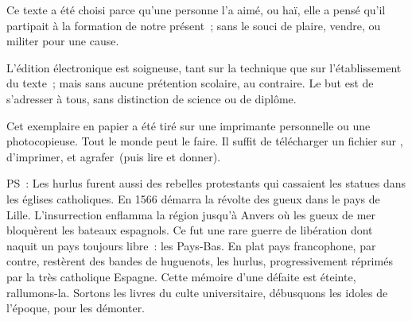 \documentclass[twoside]{book} %
\begin{document}
  Ce texte a été choisi parce qu’une personne l’a aimé,
  ou haï, elle a pensé qu’il partipait à la formation de notre présent ;
  sans le souci de plaire, vendre, ou militer pour une cause.
  \par

  L’édition électronique est soigneuse, tant sur la technique
  que sur l’établissement du texte ; mais sans aucune prétention scolaire, au contraire.
  Le but est de s’adresser à tous, sans distinction de science ou de diplôme.
  \par

  Cet exemplaire en papier a été tiré sur une imprimante personnelle
   ou une photocopieuse. Tout le monde peut le faire.
  Il suffit de
  télécharger un fichier sur \href{https://hurlus.fr}{},
  d’imprimer, et agrafer (puis lire et donner).\par

  \bigskip

  \noindent PS : Les hurlus furent aussi des rebelles protestants qui cassaient les statues dans les églises catholiques. En 1566 démarra la révolte des gueux dans le pays de Lille. L’insurrection enflamma la région jusqu’à Anvers où les gueux de mer bloquèrent les bateaux espagnols.
  Ce fut une rare guerre de libération dont naquit un pays toujours libre : les Pays-Bas.
  En plat pays francophone, par contre, restèrent des bandes de huguenots, les hurlus, progressivement réprimés par la très catholique Espagne.
  Cette mémoire d’une défaite est éteinte, rallumons-la. Sortons les livres du culte universitaire, débusquons les idoles de l’époque, pour les démonter.
\fi
\end{document}
